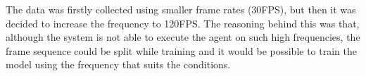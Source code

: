 The data was firstly collected using smaller frame rates (30FPS), but then it was decided to increase the frequency to 120FPS. The reasoning behind this was that, although the system is not able to execute the agent on such high frequencies, the frame sequence could be split while training and it would be possible to train the model using the frequency that suits the conditions.